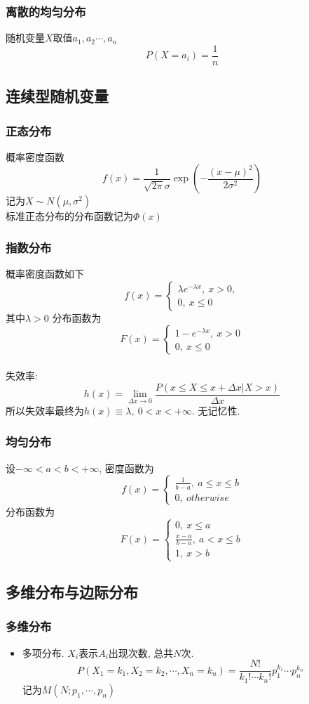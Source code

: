 \documentclass[UTF8]{article}
\newcommand{\jumpline} {\hspace*{\fill} \\}
\newcommand{\itemblt}{\item[$\bullet$]}
\newcommand{\expo}[1]{\exp\left(#1\right)}
\newcommand{\leftbig}[1]{\left\{\begin{array}{l}#1\end{array}\right.}
\begin{document}
\subsubsection{离散的均匀分布}
随机变量$X$取值$a_1,a_2\cdots,a_n$
$$P(X=a_i)=\frac{1}{n}$$

\subsection{连续型随机变量}

\subsubsection{正态分布}
概率密度函数
$$f(x)=\frac{1}{\sqrt{2\pi}\sigma}\expo{-\frac{(x-\mu)^2}{2\sigma^2}}$$
记为$X\sim N(\mu, \sigma^2)$\\
标准正态分布的分布函数记为$\Phi(x)$

\subsubsection{指数分布}
概率密度函数如下
$$f(x)=\leftbig{\lambda e^{-\lambda x},\ x>0,\\0,\ x\le0}$$
其中$\lambda>0$
分布函数为
$$F(x)=\leftbig{1-e^{-\lambda x},\ x>0\\0,\ x\le0}$$
\jumpline
失效率:
$$h(x)=\lim\limits_{\Delta x\rightarrow0}\frac{P(x\le X\le x+\Delta x|X>x)}{\Delta x}$$
所以失效率最终为$h(x)\equiv\lambda,\ 0<x<+\infty$. 无记忆性.

\subsubsection{均匀分布}
设$-\infty<a<b<+\infty$, 密度函数为
$$f(x)=\leftbig{\frac{1}{b-a},\ a\le x\le b\\0,\ otherwise}$$
分布函数为
$$F(x)=\leftbig{0,\ x\le a\\\frac{x-a}{b-a},\ a<x\le b\\1,\ x>b}$$

\subsection{多维分布与边际分布}
\subsubsection{多维分布}
\begin{itemize}
	\itemblt 多项分布. $X_i$表示$A_i$出现次数, 总共$N$次.
	$$P(X_1=k_1, X_2=k_2, \cdots, X_n=k_n)=\frac{N!}{k_1!\cdots k_n!}p_1^{k_1}\cdots p_n^{k_n}$$
	记为$M(N;p_1,\cdots,p_n)$
\end{itemize}
\end{document}
